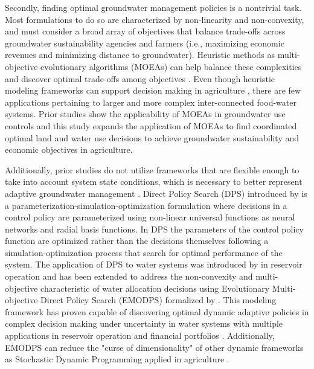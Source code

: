 \documentclass[a4paper,fleqn]{cas-sc}
\begin{document}
Secondly, finding optimal groundwater management policies is a nontrivial task. Most formulations to do so are characterized by non-linearity and non-convexity, and must consider a broad array of objectives that balance trade-offs across groundwater sustainability agencies and farmers (i.e., maximizing economic revenues and minimizing distance to groundwater). Heuristic methods as multi-objective evolutionary algorithms (MOEAs) can help balance these complexities and discover optimal trade-offs among objectives \citep{coello_evolutionary_2007}. Even though heuristic modeling frameworks can support decision making in agriculture \citep{memmah_metaheuristics_2015}, there are few applications pertaining to larger and more complex inter-connected food-water systems. Prior studies show the applicability of MOEAs in groundwater use controls \citep{afshar_multi-objective_2020,salehi_shafa_multi-objective_2023,habibi_davijani_optimization_2016,mehrabi_assessment_2021,banihabib_development_2019,hesamfar_simulation-based_2023} and this study expands the application of MOEAs to find coordinated optimal land and water use decisions to achieve groundwater sustainability and economic objectives in agriculture.  

Additionally, prior studies do not utilize frameworks that are flexible enough to take into account system state conditions,  which is necessary to better represent adaptive groundwater management \citep{thomann_adaptive_2020}. Direct Policy Search (DPS) introduced by \citet{rosenstein_robot_2001} is a parameterization-simulation-optimization formulation where decisions in a control policy are parameterized using non-linear universal functions as neural networks and radial basis functions. In DPS the parameters of the control policy function are optimized rather than the decisions themselves following a simulation-optimization process that search for optimal performance of the system. The application of DPS to water systems was introduced by \citet{koutsoyiannis_evaluation_2003} in reservoir operation and has been extended to address the non-convexity and multi-objective characteristic of water allocation decisions using Evolutionary Multi-objective Direct Policy Search (EMODPS) formalized by \citet{giuliani_coupled_2016}. This modeling framework has proven capable of discovering optimal dynamic adaptive policies in complex decision making under uncertainty in water systems \citep{macian-sorribes_inferring_2019} with multiple applications in reservoir operation and financial portfolios \citep{gupta_can_2020,zatarain_salazar_balancing_2017,hamilton_stream_2022}. Additionally, EMODPS can reduce the "curse of dimensionality" of other dynamic frameworks as Stochastic Dynamic Programming applied in agriculture \citep{taylor_dynamic_1993}. 
\end{document}

